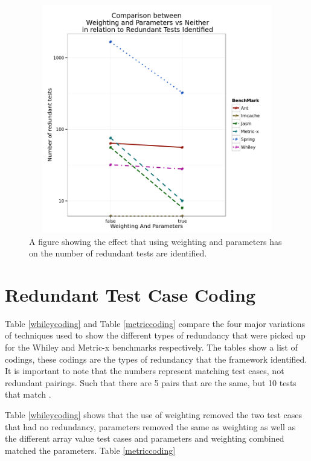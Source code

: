\begin{figure}[H]
\begin{center}
\includegraphics[height=10cm, width = 14.5cm]{WeightNParam.png}
\end{center}
\caption{A figure showing the effect that using weighting and parameters has on the number of redundant tests are identified.}
\label{fig:weightingparamgraph}
\end{figure}

\section{Redundant Test Case Coding}

Table \ref{whileycoding} and Table \ref{metriccoding} compare the four major variations of techniques used to show the different types of redundancy that were picked up for the Whiley and Metric-x benchmarks respectively. The tables show a list of codings, these codings are the types of redundancy that the framework identified. It is important to note that the numbers represent matching test cases, not redundant pairings. Such that there are 5 pairs that are the same, but 10 tests that match .

Table \ref{whileycoding} shows that the use of weighting removed the two test cases that had no redundancy, parameters removed the same as weighting as well as the different array value test cases and parameters and weighting combined matched the parameters. Table \ref{metriccoding} 

